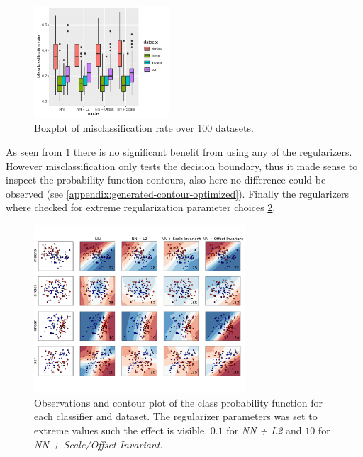 \begin{figure}[h]
	\centering
	\includegraphics[width=0.45\textwidth]{plots/2d_significant}
	\caption{Boxplot of misclassification rate over 100 datasets.}
	\label{fig:2d_significant}
\end{figure}

As seen from \cref{fig:2d_significant} there is no significant benefit from using any of the regularizers. However misclassification only tests the decision boundary, thus it made sense to inspect the probability function contours, also here no difference could be observed (see \cref{appendix:generated-contour-optimized}). Finally the regularizers where checked for extreme regularization parameter choices \cref{plt:generated-contour-extream}.

\begin{figure}[ht]
	\centering
	\includegraphics[width=0.7\textwidth, trim = 0 2.2cm 0 1.5cm, clip]{plots/2d_classifier-extream}
	\caption{Observations and contour plot of the class probability function for each classifier and dataset. The regularizer parameters was set to extreme values such the effect is visible. $0.1$ for \textit{NN + L2} and $10$ for \textit{NN + Scale/Offset Invariant}.}
	\label{plt:generated-contour-extream}
\end{figure}

